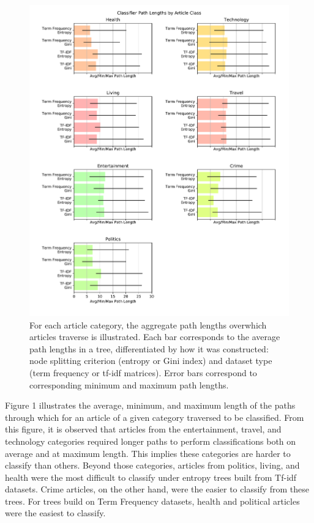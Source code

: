 \documentclass[11pt]{article}
\begin{document}
\begin{figure}[h!] \label{fig:pathlengths}
  \centering
  \includegraphics[width=\textwidth]{figures/decision_tree/path_depths}
  \caption{For each article category, the aggregate path lengths overwhich articles traverse is illustrated.
  Each bar corresponds to the average path lengths in a tree, differentiated by how it was constructed: node splitting criterion (entropy or Gini index) and dataset type (term frequency or tf-idf matrices).
  Error bars correspond to corresponding minimum and maximum path lengths.}
\end{figure}


Figure 1 illustrates the average, minimum, and maximum length of the paths through which for an article of a given category traversed to be classified.
From this figure, it is observed that articles from the entertainment, travel, and technology categories required longer paths to perform classifications both on average and at maximum length.
This implies these categories are harder to classify than others.
Beyond those categories, articles from politics, living, and health were the most difficult to classify under entropy trees built from Tf-idf datasets.
Crime articles, on the other hand, were the easier to classify from these trees.
For trees build on Term Frequency datasets, health and political articles were the easiest to classify.
\end{document}
